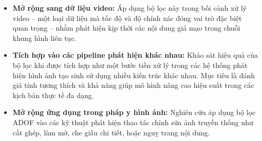 \begin{itemize}
		
	\item \textbf{Mở rộng sang dữ liệu video:} Áp dụng bộ lọc này trong bối cảnh xử lý video -- một loại dữ liệu mà tốc độ và độ chính xác đóng vai trò đặc biệt quan trọng -- nhằm phát hiện kịp thời các nội dung giả mạo trong chuỗi khung hình liên tục.
		
    \item \textbf{Tích hợp vào các \gls{pipeline} phát hiện khác nhau:} Khảo sát hiệu quả của bộ lọc khi được tích hợp như một bước tiền xử lý trong các hệ thống phát hiện hình ảnh tạo sinh sử dụng nhiều kiến trúc khác nhau. Mục tiêu là đánh giá tính tương thích và khả năng giúp mô hình nâng cao hiệu suất trong các kịch bản thực tế đa dạng.
    
    \item \textbf{Mở rộng ứng dụng trong pháp y hình ảnh:} Nghiên cứu áp dụng bộ lọc ADOF vào các kỹ thuật phát hiện thao tác chỉnh sửa ảnh truyền thống như cắt ghép, làm mờ, che giấu chi tiết, hoặc nguỵ trang nội dung.


\end{itemize}
%
%



%
%

